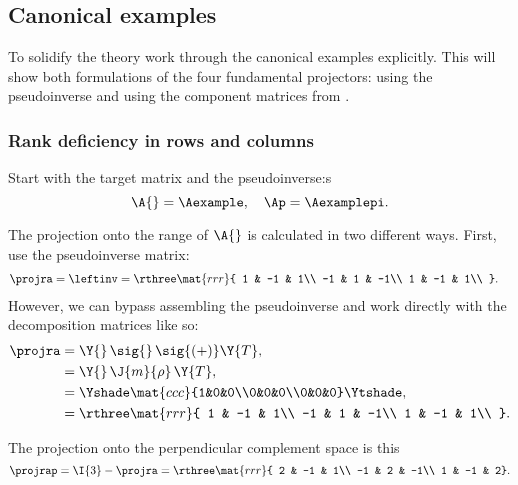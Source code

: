 \subsection{Canonical examples}
To solidify the theory work through the canonical examples explicitly. This will show both formulations of the four fundamental projectors: using the pseudoinverse and using the component matrices from \svdl.

\subsubsection{Rank deficiency in rows and columns}
Start with the target matrix and the pseudoinverse:s
\begin{equation}
  \A{} = \Aexample, \quad \Ap = \Aexamplepi.
\end{equation}

The projection onto the range of $\A{}$ is calculated in two different ways. First, use the pseudoinverse matrix:
\begin{equation}
\begin{split}
  \projra &= \leftinv = \rthree
    \mat{rrr}
    { 
    1 & -1 &  1\\
   -1 &  1 & -1\\
    1 & -1 &  1\\
    }.
\end{split}
\end{equation}
However, we can bypass assembling the pseudoinverse and work directly with the decomposition matrices like so:
\begin{equation}
\begin{split}
  \projra &= \Y{}\,\sig{}\,\sig{(+)}\Y{T},\\
    & = \Y{}\,\J{m}{\rho}\,\Y{T},\\
    &= \Yshade \mat{ccc}{1&0&0\\0&0&0\\0&0&0} \Ytshade,\\
    &= \rthree
    \mat{rrr}
    { 
    1 & -1 &  1\\
   -1 &  1 & -1\\
    1 & -1 &  1\\
    }.
\end{split}
\end{equation}

The projection onto the perpendicular complement space  is this
\begin{equation}
  \projrap = \I{3} - \projra = \rthree
    \mat{rrr}
    { 2 & -1 &  1\\
     -1 &  2 & -1\\
      1 & -1 &  2}.
\end{equation}

